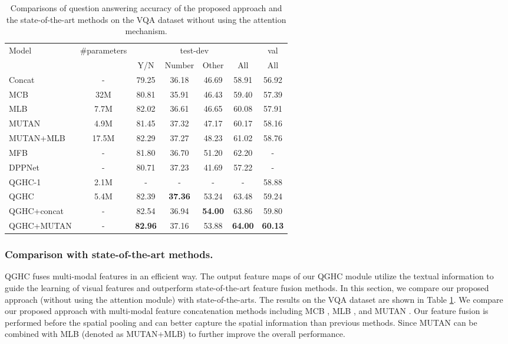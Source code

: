 \documentclass[runningheads]{llncs}
\begin{document}
\begin{table}[tb]
\scriptsize
\centering
\begin{tabular}{l c c c c c c}
\toprule
\multirow{2}{*}{Model} & \multirow{2}{*}{\#parameters} &  \multicolumn{4}{c}{test-dev} & \multicolumn{1}{c}{val} \\
\cmidrule(lr){3-6} \cmidrule(lr){7-7} 
 &  & Y/N  & Number & Other & All & All\\
\hline
Concat \cite{zhou2016learning}& - &79.25 & 36.18 & 46.69 & 58.91 & 56.92 \\
MCB \cite{fukui2016multimodal}&32M &80.81 & 35.91 & 46.43 & 59.40 & 57.39 \\
MLB \cite{kim2016hadamard}&7.7M &82.02 & 36.61 & 46.65 & 60.08 & 57.91 \\
MUTAN \cite{ben2017mutan}&4.9M &81.45 & 37.32 & 47.17 & 60.17 & 58.16\\
MUTAN+MLB \cite{ben2017mutan}&17.5M &82.29 & 37.27 & 48.23 & 61.02 & 58.76\\
MFB \cite{yu2017multi}&-&81.80  & 36.70 &  51.20  & 62.20  &  -   \\
DPPNet \cite{noh2016image}&-&80.71 & 37.23 & 41.69 & 57.22 &   -    \\  
\hline
QGHC-1    &2.1M & -    &   -   &    -  &   -   &   58.88 \\
QGHC      &5.4M &82.39 & \textbf{37.36} & 53.24 & 63.48 & 59.24 \\
QGHC+concat &-&82.54  & 36.94 & \textbf{54.00} & 63.86 & 59.80\\
QGHC+MUTAN &-&\textbf{82.96}  & 37.16  & 53.88 & \textbf{64.00} & \textbf{60.13} \\
\bottomrule
\end{tabular}
\caption{Comparisons of question answering accuracy of the proposed approach and the state-of-the-art methods on the VQA dataset without using the attention mechanism.}
\label{tab:no_attention}
\end{table}



\subsubsection{Comparison with state-of-the-art methods.}
\label{sssec:vqa_results}

QGHC fuses multi-modal features in an efficient way. The output feature maps of our QGHC module utilize the textual information to guide the learning of visual features and outperform state-of-the-art feature fusion methods. In this section, we compare our proposed approach (without using the attention module) with state-of-the-arts. The results on the VQA dataset are shown in Table \ref{tab:no_attention}. We compare our proposed approach with multi-modal feature concatenation methods including MCB \cite{fukui2016multimodal}, MLB \cite{kim2016hadamard}, and MUTAN \cite{ben2017mutan}. Our feature fusion is performed before the spatial pooling and can better capture the spatial information than previous methods.
Since MUTAN can be combined with MLB (denoted as MUTAN+MLB) to further improve the overall performance.
\end{document}
